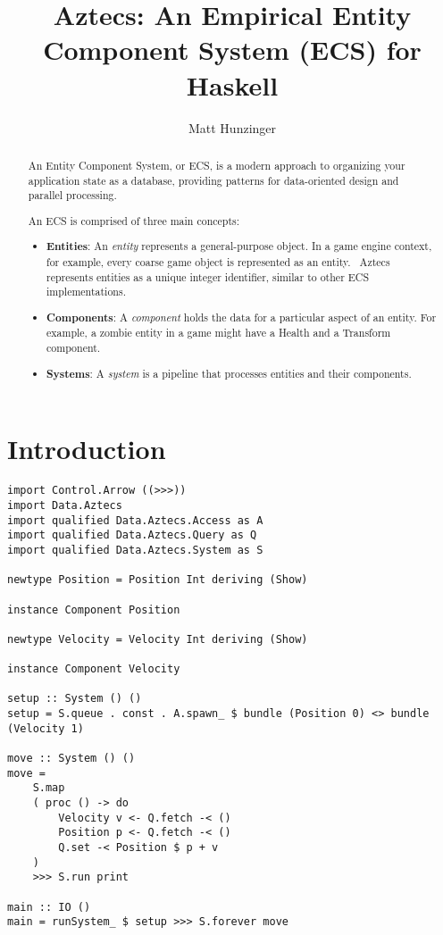 \documentclass[sigplan,screen,nonacm]{acmart}
\title{Aztecs: An Empirical Entity Component System (ECS) for Haskell}
\author{Matt Hunzinger}
\begin{document}
\begin{abstract}
  An Entity Component System, or ECS,
  is a modern approach to organizing your application state as a database,
  providing patterns for data-oriented design and parallel processing.

  An ECS is comprised of three main concepts:
  \begin{itemize}
    \item \textbf{Entities}: An \textit{entity} represents a general-purpose object. In a game engine
          context, for example, every coarse game object is represented as an
          entity.~\cite{ecsWiki} Aztecs represents entities as a unique integer
          identifier, similar to other ECS implementations.
    \item \textbf{Components}: A \textit{component} holds the data for a particular aspect of an entity.
          For example, a zombie entity in a game might have a Health and a Transform component.
    \item \textbf{Systems}: A \textit{system} is a pipeline that processes entities and their components.
  \end{itemize}
\end{abstract}

\maketitle

\section{Introduction}

\begin{lstlisting}
import Control.Arrow ((>>>))
import Data.Aztecs
import qualified Data.Aztecs.Access as A
import qualified Data.Aztecs.Query as Q
import qualified Data.Aztecs.System as S

newtype Position = Position Int deriving (Show)

instance Component Position

newtype Velocity = Velocity Int deriving (Show)

instance Component Velocity

setup :: System () ()
setup = S.queue . const . A.spawn_ $ bundle (Position 0) <> bundle (Velocity 1)

move :: System () ()
move =
    S.map
    ( proc () -> do
        Velocity v <- Q.fetch -< ()
        Position p <- Q.fetch -< ()
        Q.set -< Position $ p + v
    )
    >>> S.run print

main :: IO ()
main = runSystem_ $ setup >>> S.forever move
\end{lstlisting}



\end{document}
